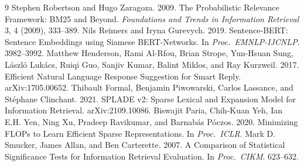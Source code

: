 \documentclass[sigconf,nonacm]{acmart}
\begin{document}
\begin{thebibliography}{9}
 Stephen Robertson and Hugo Zaragoza. 2009. The Probabilistic Relevance Framework: BM25 and Beyond. \emph{Foundations and Trends in Information Retrieval} 3, 4 (2009), 333--389.
 Nils Reimers and Iryna Gurevych. 2019. Sentence-BERT: Sentence Embeddings using Siamese BERT-Networks. In \emph{Proc.\ EMNLP-IJCNLP}. 3982--3992.
 Matthew Henderson, Rami Al-Rfou, Brian Strope, Yun-Hsuan Sung, L\'aszl\'o Luk\'acs, Ruiqi Guo, Sanjiv Kumar, Balint Miklos, and Ray Kurzweil. 2017. Efficient Natural Language Response Suggestion for Smart Reply. arXiv:1705.00652.
 Thibault Formal, Benjamin Piwowarski, Carlos Lassance, and St\'ephane Clinchant. 2021. SPLADE v2: Sparse Lexical and Expansion Model for Information Retrieval. arXiv:2109.10086.
 Biswajit Paria, Chih-Kuan Yeh, Ian E.H. Yen, Ning Xu, Pradeep Ravikumar, and Barnab\'as P\'oczos. 2020. Minimizing FLOPs to Learn Efficient Sparse Representations. In \emph{Proc.\ ICLR}.
 Mark D. Smucker, James Allan, and Ben Carterette. 2007. A Comparison of Statistical Significance Tests for Information Retrieval Evaluation. In \emph{Proc.\ CIKM}. 623--632.
\end{thebibliography}
\end{document}
